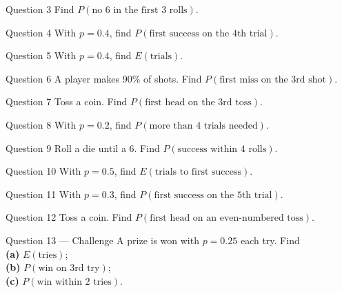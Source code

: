 \documentclass[11pt]{article}
\begin{document}
\begin{qbox}{Question 3}
Find $P(\text{no 6 in the first 3 rolls})$.\workspace{2.4cm}
\end{qbox}

\begin{qbox}{Question 4}
With $p=0.4$, find $P(\text{first success on the 4th trial})$.\workspace{2.4cm}
\end{qbox}

\begin{qbox}{Question 5}
With $p=0.4$, find $E(\text{trials})$.\workspace{2.4cm}
\end{qbox}

\begin{qbox}{Question 6}
A player makes 90\% of shots. Find $P(\text{first miss on the 3rd shot})$.\workspace{2.4cm}
\end{qbox}

\begin{qbox}{Question 7}
Toss a coin. Find $P(\text{first head on the 3rd toss})$.\workspace{2.4cm}
\end{qbox}

\begin{qbox}{Question 8}
With $p=0.2$, find $P(\text{more than 4 trials needed})$.\workspace{2.4cm}
\end{qbox}

\begin{qbox}{Question 9}
Roll a die until a 6. Find $P(\text{success within 4 rolls})$.\workspace{2.4cm}
\end{qbox}

\begin{qbox}{Question 10}
With $p=0.5$, find $E(\text{trials to first success})$.\workspace{2.4cm}
\end{qbox}

\begin{qbox}{Question 11}
With $p=0.3$, find $P(\text{first success on the 5th trial})$.\workspace{2.4cm}
\end{qbox}

\begin{qbox}{Question 12}
Toss a coin. Find $P(\text{first head on an even-numbered toss})$.\workspace{2.4cm}
\end{qbox}

\begin{qbox}{Question 13 --- Challenge}
A prize is won with $p=0.25$ each try. Find \\ \textbf{(a)} $E(\text{tries})$; \\ \textbf{(b)} $P(\text{win on 3rd try})$; \\ \textbf{(c)} $P(\text{win within 2 tries})$.\workspace{3.2cm}
\end{qbox}
\end{document}

